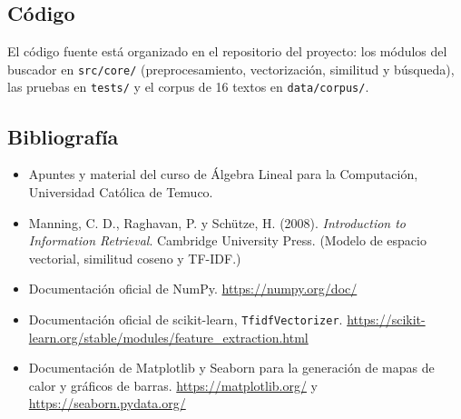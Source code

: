 \documentclass[12pt,a4paper]{article}
\begin{document}
\subsection{Código}
El código fuente está organizado en el repositorio del proyecto: los módulos del buscador en \texttt{src/core/} (preprocesamiento, vectorización, similitud y búsqueda), las pruebas en \texttt{tests/} y el corpus de 16 textos en \texttt{data/corpus/}.

\subsection{Bibliografía}
\begin{itemize}
    \item Apuntes y material del curso de Álgebra Lineal para la Computación, Universidad Católica de Temuco.
    \item Manning, C. D., Raghavan, P. y Schütze, H. (2008). \textit{Introduction to Information Retrieval}. Cambridge University Press. (Modelo de espacio vectorial, similitud coseno y TF-IDF.)
    \item Documentación oficial de NumPy. \url{https://numpy.org/doc/}
    \item Documentación oficial de scikit-learn, \texttt{TfidfVectorizer}. \url{https://scikit-learn.org/stable/modules/feature_extraction.html}
    \item Documentación de Matplotlib y Seaborn para la generación de mapas de calor y gráficos de barras. \url{https://matplotlib.org/} y \url{https://seaborn.pydata.org/}
\end{itemize}
\end{document}
